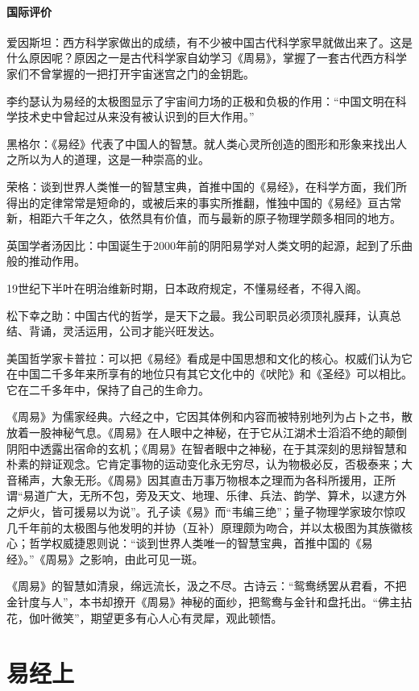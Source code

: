 \documentclass[12pt,UTF8]{ctexbook}
\begin{document}
\subsection{国际评价}
爱因斯坦：西方科学家做出的成绩，有不少被中国古代科学家早就做出来了。这是什么原因呢？原因之一是古代科学家自幼学习《周易》，掌握了一套古代西方科学家们不曾掌握的一把打开宇宙迷宫之门的金钥匙。

李约瑟认为易经的太极图显示了宇宙间力场的正极和负极的作用：“中国文明在科学技术史中曾起过从来没有被认识到的巨大作用。”

黑格尔：《易经》代表了中国人的智慧。就人类心灵所创造的图形和形象来找出人之所以为人的道理，这是一种崇高的业。

荣格：谈到世界人类惟一的智慧宝典，首推中国的《易经》，在科学方面，我们所得出的定律常常是短命的，或被后来的事实所推翻，惟独中国的《易经》亘古常新，相距六千年之久，依然具有价值，而与最新的原子物理学颇多相同的地方。

英国学者汤因比：中国诞生于2000年前的阴阳易学对人类文明的起源，起到了乐曲般的推动作用。

19世纪下半叶在明治维新时期，日本政府规定，不懂易经者，不得入阁。 

松下幸之助：中国古代的哲学，是天下之最。我公司职员必须顶礼膜拜，认真总结、背诵，灵活运用，公司才能兴旺发达。

美国哲学家卡普拉：可以把《易经》看成是中国思想和文化的核心。权威们认为它在中国二千多年来所享有的地位只有其它文化中的《吠陀》和《圣经》可以相比。它在二千多年中，保持了自己的生命力。

《周易》为儒家经典。六经之中，它因其体例和内容而被特别地列为占卜之书，散放着一股神秘气息。《周易》在人眼中之神秘，在于它从江湖术士滔滔不绝的颠倒阴阳中透露出宿命的玄机；《周易》在智者眼中之神秘，在于其深刻的思辩智慧和朴素的辩证观念。它肯定事物的运动变化永无穷尽，认为物极必反，否极泰来；大音稀声，大象无形。《周易》因其直击万事万物根本之理而为各科所援用，正所谓“易道广大，无所不包，旁及天文、地理、乐律、兵法、韵学、算术，以逮方外之炉火，皆可援易以为说”。孔子读《易》而“韦编三绝”；量子物理学家玻尔惊叹几千年前的太极图与他发明的并协（互补）原理颇为吻合，并以太极图为其族徽核心；哲学权威捷恩则说：“谈到世界人类唯一的智慧宝典，首推中国的《易经》。”《周易》之影响，由此可见一斑。

《周易》的智慧如清泉，绵远流长，汲之不尽。古诗云：“鸳鸯绣罢从君看，不把金针度与人”，本书却撩开《周易》神秘的面纱，把鸳鸯与金针和盘托出。“佛主拈花，伽叶微笑”，期望更多有心人心有灵犀，观此顿悟。


\mainmatter

\part{易经上}
\end{document}
